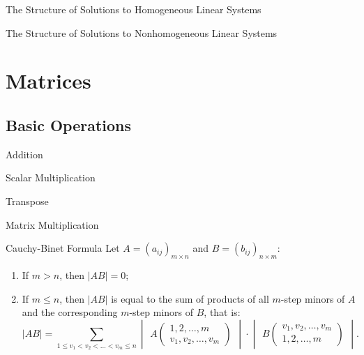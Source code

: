 \documentclass[11pt]{../../TexTemplate/elegantbook} %
\begin{document}
\begin{leftbarTitle}{The Structure of Solutions to Homogeneous Linear Systems}\end{leftbarTitle}

\begin{leftbarTitle}{The Structure of Solutions to Nonhomogeneous Linear Systems}\end{leftbarTitle}


\chapter{Matrices}
\section{Basic Operations}
\begin{leftbarTitle}{Addition}\end{leftbarTitle}
\begin{leftbarTitle}{Scalar Multiplication}\end{leftbarTitle}
\begin{leftbarTitle}{Transpose}\end{leftbarTitle}
\begin{leftbarTitle}{Matrix Multiplication}\end{leftbarTitle}

\begin{theorem}{Cauchy-Binet Formula}
    Let \( A = (a_{ij})_{m \times n} \) and \( B = (b_{ij})_{n \times m} \):  
    \begin{enumerate}
        \item If \( m > n \), then \( |AB| = 0 \);
        \item If \( m \leq n \), then \( |AB| \) is equal to 
        the sum of products of all \( m \)-step minors of \( A \) and 
        the corresponding \( m \)-step minors of \( B \), that is:
        \[
        |AB| = \sum_{1 \leq v_1 < v_2 < \dots < v_m \leq n} 
        \begin{vmatrix}
        A\begin{pmatrix}
        1, 2, \dots, m \\
        v_1, v_2, \dots, v_m
        \end{pmatrix}
        \end{vmatrix}
        \cdot 
        \begin{vmatrix}
        B\begin{pmatrix}
        v_1, v_2, \dots, v_m \\
        1, 2, \dots, m
        \end{pmatrix}
        \end{vmatrix}.
        \]
    \end{enumerate}
\end{theorem}
\end{document}
